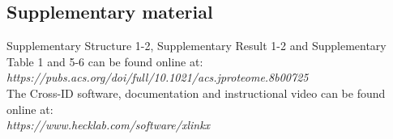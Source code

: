 \clearpage
\begin{subappendices}
  \beginsupplement

  \section{Supplementary material}
  Supplementary Structure 1-2, Supplementary Result 1-2 and Supplementary Table 1 and 5-6 can be found online at:\\
  \emph{https://pubs.acs.org/doi/full/10.1021/acs.jproteome.8b00725}\\
  The Cross-ID software, documentation and instructional video can be found online at:\\
  \emph{https://www.hecklab.com/software/xlinkx}\\
  \label{struct:structdummy2.1}
  \label{struct:structdummy2.2}
  \addtocounter{table}{-2}
  \label{tab:tabdummy2.1}
  \addtocounter{table}{3}
  \label{tab:tabdummy2.5}
  \label{tab:tabdummy2.6}
  \addtocounter{table}{-6}


\end{subappendices}

